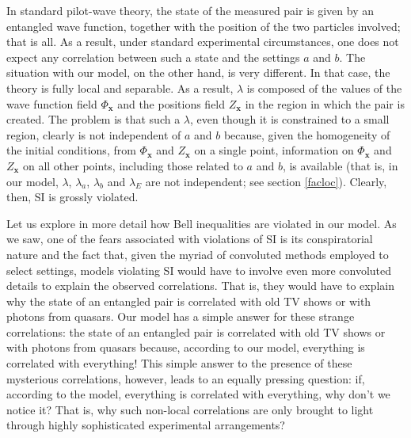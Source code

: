 \documentclass[letterpaper,12pt]{article}
\begin{document}
In standard pilot-wave theory, the state of the measured pair is given by an entangled wave function, together with the position of the two particles involved; that is all. As a result, under standard experimental circumstances, one does not expect any correlation between such a state and the settings $a$ and $b$. The situation with our model, on the other hand, is very different. In that case, the theory is fully local and separable. As a result, $\lambda$ is composed of the values of the wave function field $\Phi_\mathbf{x} $ and the positions field $Z_\mathbf{x}$ in the region in which the pair is created. The problem is that such a $\lambda$, even though it is constrained to a small region, clearly is not independent of $a$ and $b$ because, given the homogeneity of the initial conditions, from $\Phi_\mathbf{x} $ and $Z_\mathbf{x}$ on a single point, information on $\Phi_\mathbf{x} $ and $Z_\mathbf{x}$ on all other points, including those related to $a$ and $b$, is available (that is, in our model, $\lambda$, $\lambda_a$, $\lambda_b$ and $\lambda_E$ are not independent; see section \ref{facloc}). Clearly, then, SI is grossly violated.

Let us explore in more detail how Bell inequalities are violated in our model. As we saw, one of the fears associated with violations of SI is its conspiratorial nature and the fact that, given the myriad of convoluted methods employed to select settings, models violating SI would have to involve even more convoluted details to explain the observed correlations. That is, they would have to explain why the state of an entangled pair is correlated with old TV shows or with photons from quasars. Our model has a simple answer for these strange correlations: the state of an entangled pair is correlated with old TV shows or with photons from quasars because, according to our model, everything is correlated with everything! This simple answer to the presence of these mysterious correlations, however, leads to an equally pressing question: if, according to the model, everything is correlated with everything, why don't we notice it? That is, why such non-local correlations are only brought to light through highly sophisticated experimental arrangements?
\end{document}
